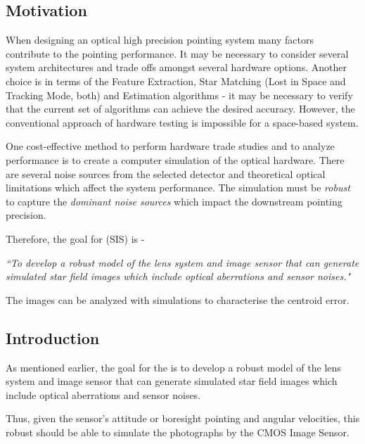 \documentclass[../../main.tex]{subfiles}
\begin{document}

\subsection{Motivation} %
When designing an optical high precision pointing system many factors contribute to the pointing performance. It may be necessary to consider several system architectures and trade offs amongst several hardware options. Another choice is in terms of the Feature Extraction, Star Matching (Lost in Space and Tracking Mode, both) and Estimation algorithms - it may be necessary to verify that the current set of algorithms can achieve the desired accuracy. However, the conventional approach of hardware testing is impossible for a space-based system. 

One cost-effective method to perform hardware trade studies and to analyze performance is to create a computer simulation of the optical hardware. There are several noise sources from the selected detector and theoretical optical limitations which affect the system performance. The simulation must be \emph{robust} to capture the \emph{dominant noise sources} which impact the downstream pointing precision. 

Therefore, the goal for \SIS (SIS) is -
\begin{displayquote}
    \emph{``To develop a robust model of the lens system and image sensor that can generate simulated star field images which include optical aberrations and sensor noises."}
\end{displayquote}
The images can be analyzed with simulations to characterise the centroid error.


\subsection{Introduction} %

As mentioned earlier, the goal for the \SIS is to develop a robust model of the lens system and image sensor that can generate simulated star field images which include optical aberrations and sensor noises. 

Thus, given the sensor's attitude or boresight pointing and angular velocities, this robust \SISM should be able to simulate the photographs by the CMOS Image Sensor. 

\end{document}
